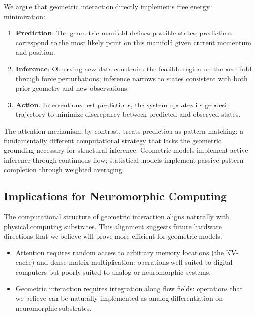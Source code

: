 \documentclass[12pt,a4paper]{article}
\begin{document}
We argue that geometric interaction directly implements free energy minimization:

\begin{enumerate}
    \item \textbf{Prediction}: The geometric manifold defines possible states; predictions correspond to the most likely point on this manifold given current momentum and position.

    \item \textbf{Inference}: Observing new data constrains the feasible region on the manifold through force perturbations; inference narrows to states consistent with both prior geometry and new observations.

    \item \textbf{Action}: Interventions test predictions; the system updates its geodesic trajectory to minimize discrepancy between predicted and observed states.
\end{enumerate}

The attention mechanism, by contrast, treats prediction as pattern matching: a fundamentally different computational strategy that lacks the geometric grounding necessary for structural inference. Geometric models implement active inference through continuous flow; statistical models implement passive pattern completion through weighted averaging.

\subsection{Implications for Neuromorphic Computing}
\label{sec:neuromorphic}

The computational structure of geometric interaction aligns naturally with physical computing substrates. This alignment suggests future hardware directions that we believe will prove more efficient for geometric models:

\begin{itemize}
    \item Attention requires random access to arbitrary memory locations (the KV-cache) and dense matrix multiplication: operations well-suited to digital computers but poorly suited to analog or neuromorphic systems.

    \item Geometric interaction requires integration along flow fields: operations that we believe can be naturally implemented as analog differentiation on neuromorphic substrates.
\end{itemize}
\end{document}

